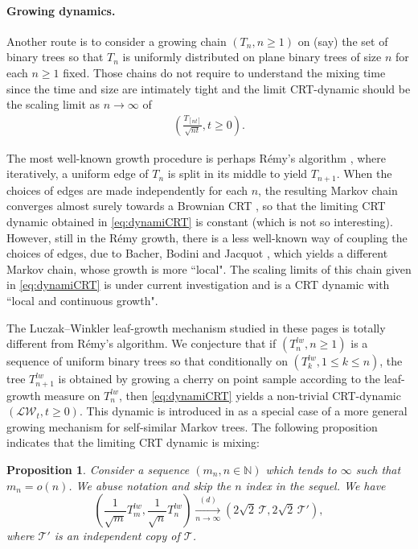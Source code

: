 \documentclass[11pt]{article}
\newcommand{\T}{\mathcal{T}}
\newcommand{\N}{\mathbb{N}}
\renewcommand{\geq}{\geqslant}
\renewcommand{\leq}{\leqslant}
\newtheorem{prop}[thm]{Proposition}
\begin{document}
\paragraph{Growing dynamics.} Another route is to consider a growing chain  $(T_n , n \geq 1)$ on (say) the set of binary trees so that $T_n$ is uniformly distributed on plane binary trees of size $n$ for each $n \geq 1$ fixed. Those chains do not require to understand the mixing time since the time and size are intimately tight and the limit CRT-dynamic should be the scaling limit as $n \to \infty$ of
 \begin{eqnarray} \label{eq:dynamiCRT}  \left( \frac{T_{[n t]}}{ \sqrt{n t}},t\geq 0\right).\end{eqnarray}

The most well-known growth procedure is perhaps Rémy's algorithm \cite{Rem85}, where iteratively, a uniform edge of $T_n$ is split in its middle to yield $T_{n+1}$. When the choices of edges are made independently for each  $n$, the  resulting Markov chain converges almost surely towards a Brownian CRT \cite{CurienHaas}, so that the limiting CRT dynamic obtained in \eqref{eq:dynamiCRT} is constant (which is not so interesting). However, still in the R\'emy growth, there is a less well-known way of coupling the choices of edges, due to Bacher, Bodini and Jacquot \cite{bacher2017efficient}, which yields a different Markov chain, whose growth is more ``local". The scaling limits of this chain given in \eqref{eq:dynamiCRT} is under current investigation and is a CRT dynamic with ``local and continuous growth". 

The Luczak--Winkler leaf-growth mechanism studied in these pages is totally different from Rémy's algorithm. We conjecture that if $(T^{lw}_n, n \geq 1)$ is a sequence of uniform binary trees  so that conditionally on $ (T^{lw}_k, 1 \leq k \leq n)$, the tree $ T^{lw}_{n+1}$ is obtained by growing a cherry on point sample according to the leaf-growth measure on $ T^{lw}_n$,  then \eqref{eq:dynamiCRT} yields a non-trivial CRT-dynamic $( \mathcal{LW}_t, t\geq 0)$. This dynamic is introduced in \cite{CFT25} as a special case of a more general growing mechanism for self-similar Markov trees. The following proposition indicates that the limiting CRT dynamic is mixing:


\begin{prop}\label{prop:pairedindep}
Consider a sequence $(m_n,n\in\N)$ which tends to $\infty$ such that $m_n=o(n)$. We abuse notation and skip the $n$ index in the sequel. We have
\[ \left(\frac{1}{\sqrt{m}}T^{lw}_m,\frac{1}{\sqrt{n}}T^{lw}_n\right) \underset{n\to\infty}{\overset{(d)}\longrightarrow} (2\sqrt{2}\,\T,2\sqrt{2}\,\T'),\]
where $\T'$ is an independent copy of $\T$.
\end{prop}
\end{document}
